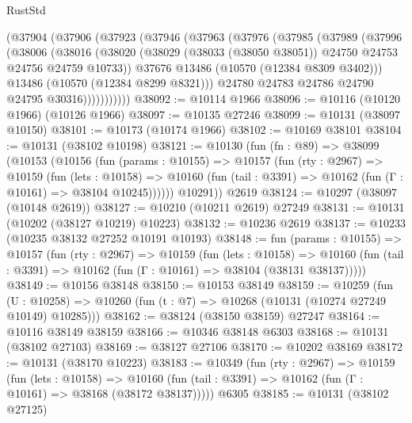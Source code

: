 \begin{lexlean}{RustStd}
\begin{coremodule}
        (@37904
          (@37906
            (@37923
              (@37946
                (@37963
                  (@37976
                    (@37985
                      (@37989
                        (@37996
                          (@38006
                            (@38016
                              (@38020
                                (@38029
                                  (@38033 (@38050 @38051))
                                  @24750
                                  @24753
                                  @24756
                                  @24759
                                  @10733))
                              @37676
                              @13486
                              (@10570 (@12384 @8309 @3402)))
                            @13486
                            (@10570 (@12384 @8299 @8321)))
                          @24780
                          @24783
                          @24786
                          @24790
                          @24795
                          @30316)))))))))))
@38092 := @10114 @1966
@38096 := @10116 (@10120 @1966) (@10126 @1966)
@38097 := @10135 @27246
@38099 := @10131 (@38097 @10150)
@38101 := @10173 (@10174 @1966)
@38102 := @10169 @38101
@38104 := @10131 (@38102 @10198)
@38121 := @10130
    (fun (fn : @89) =>
    @38099
      (@10153
        (@10156
          (fun (params : @10155) =>
          @10157
            (fun (rty : @2967) =>
            @10159
              (fun (lets : @10158) =>
              @10160 (fun (tail : @3391) => @10162 (fun (Γ : @10161) => @38104 @10245))))))
        @10291))
    @2619
@38124 := @10297 (@38097 (@10148 @2619))
@38127 := @10210 (@10211 @2619) @27249
@38131 := @10131 (@10202 (@38127 @10219) @10223)
@38132 := @10236 @2619
@38137 := @10233 (@10235 @38132 @27252 @10191 @10193)
@38148 := fun (params : @10155) =>
  @10157
    (fun (rty : @2967) =>
    @10159
      (fun (lets : @10158) =>
      @10160 (fun (tail : @3391) => @10162 (fun (Γ : @10161) => @38104 (@38131 @38137)))))
@38149 := @10156 @38148
@38150 := @10153 @38149
@38159 := @10259
    (fun (U : @10258) => @10260 (fun (t : @7) => @10268 (@10131 (@10274 @27249 @10149) @10285)))
@38162 := @38124 (@38150 @38159) @27247
@38164 := @10116 @38149 @38159
@38166 := @10346 @38148 @6303
@38168 := @10131 (@38102 @27103)
@38169 := @38127 @27106
@38170 := @10202 @38169
@38172 := @10131 (@38170 @10223)
@38183 := @10349
    (fun (rty : @2967) =>
    @10159
      (fun (lets : @10158) =>
      @10160 (fun (tail : @3391) => @10162 (fun (Γ : @10161) => @38168 (@38172 @38137)))))
    @6305
@38185 := @10131 (@38102 @27125)

\end{coremodule}
\end{lexlean}
